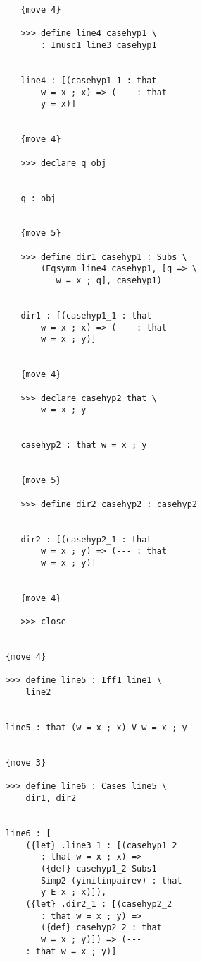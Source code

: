 \documentclass[12pt]{article}
\begin{document}
\begin{verbatim}
               {move 4}

               >>> define line4 casehyp1 \
                   : Inusc1 line3 casehyp1


               line4 : [(casehyp1_1 : that 
                   w = x ; x) => (--- : that 
                   y = x)]


               {move 4}

               >>> declare q obj


               q : obj


               {move 5}

               >>> define dir1 casehyp1 : Subs \
                   (Eqsymm line4 casehyp1, [q => \
                      w = x ; q], casehyp1)


               dir1 : [(casehyp1_1 : that 
                   w = x ; x) => (--- : that 
                   w = x ; y)]


               {move 4}

               >>> declare casehyp2 that \
                   w = x ; y


               casehyp2 : that w = x ; y


               {move 5}

               >>> define dir2 casehyp2 : casehyp2


               dir2 : [(casehyp2_1 : that 
                   w = x ; y) => (--- : that 
                   w = x ; y)]


               {move 4}

               >>> close


            {move 4}

            >>> define line5 : Iff1 line1 \
                line2


            line5 : that (w = x ; x) V w = x ; y


            {move 3}

            >>> define line6 : Cases line5 \
                dir1, dir2


            line6 : [
                ({let} .line3_1 : [(casehyp1_2 
                   : that w = x ; x) => 
                   ({def} casehyp1_2 Subs1 
                   Simp2 (yinitinpairev) : that 
                   y E x ; x)]), 
                ({let} .dir2_1 : [(casehyp2_2 
                   : that w = x ; y) => 
                   ({def} casehyp2_2 : that 
                   w = x ; y)]) => (--- 
                : that w = x ; y)]



\end{verbatim}
\end{document}
